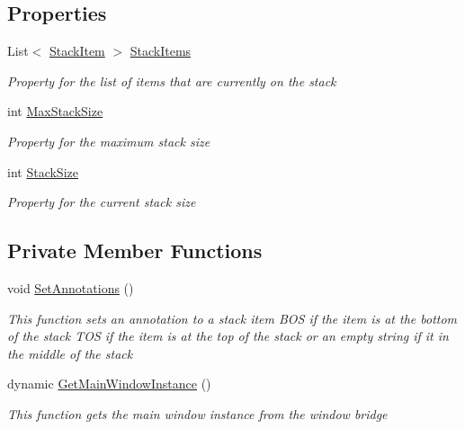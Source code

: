 \subsection*{Properties}
\begin{DoxyCompactItemize}
\item 
List$<$ \hyperlink{class_c_p_u___o_s___simulator_1_1_c_p_u_1_1_stack_item}{Stack\+Item} $>$ \hyperlink{class_c_p_u___o_s___simulator_1_1_c_p_u_1_1_program_stack_a13eb0a485bbcdba8a38bbf80e78692c7}{Stack\+Items}
\begin{DoxyCompactList}\small\item\em Property for the list of items that are currently on the stack \end{DoxyCompactList}\item 
int \hyperlink{class_c_p_u___o_s___simulator_1_1_c_p_u_1_1_program_stack_a5ed770e83658cfcde6e451c27342dca3}{Max\+Stack\+Size}
\begin{DoxyCompactList}\small\item\em Property for the maximum stack size \end{DoxyCompactList}\item 
int \hyperlink{class_c_p_u___o_s___simulator_1_1_c_p_u_1_1_program_stack_ac9cedcbfdf26ffa757042280f21da367}{Stack\+Size}
\begin{DoxyCompactList}\small\item\em Property for the current stack size \end{DoxyCompactList}\end{DoxyCompactItemize}
\subsection*{Private Member Functions}
\begin{DoxyCompactItemize}
\item 
void \hyperlink{class_c_p_u___o_s___simulator_1_1_c_p_u_1_1_program_stack_a64ba20aa2a49863d1197a9aeb31b4a13}{Set\+Annotations} ()
\begin{DoxyCompactList}\small\item\em This function sets an annotation to a stack item B\+O\+S if the item is at the bottom of the stack T\+O\+S if the item is at the top of the stack or an empty string if it in the middle of the stack \end{DoxyCompactList}\item 
dynamic \hyperlink{class_c_p_u___o_s___simulator_1_1_c_p_u_1_1_program_stack_a5e86416fb4e4bdff3605a40f521ea211}{Get\+Main\+Window\+Instance} ()
\begin{DoxyCompactList}\small\item\em This function gets the main window instance from the window bridge \end{DoxyCompactList}\end{DoxyCompactItemize}
